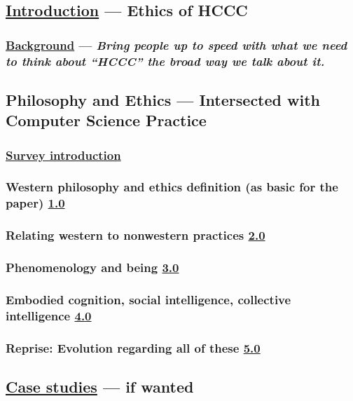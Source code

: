 \documentclass[11pt]{article}
\begin{document}
\subsection{\hyperref[sec:orga13a53c]{Introduction} — Ethics of HCCC}
\label{sec:org2f5e893}
\subsubsection{\hyperref[sec:org71daf48]{Background} — \emph{Bring people up to speed with what we need to think about “HCCC” the broad way we talk about it.}}
\label{sec:orgd7f349e}
\subsection{Philosophy and Ethics — Intersected with Computer Science Practice}
\label{sec:org7c7d609}
\subsubsection{\hyperref[sec:org6c6ca17]{Survey introduction}}
\label{sec:org123b528}
\subsubsection{Western philosophy and ethics definition (as basic for the paper) \hyperref[sec:org6bf393e]{1.0}}
\label{sec:org2c02f3f}
\subsubsection{Relating western to nonwestern practices \hyperref[sec:org017783c]{2.0}}
\label{sec:orge8198d1}
\subsubsection{Phenomenology and being \hyperref[sec:orgcbc9a7d]{3.0}}
\label{sec:org8f1f0b3}
\subsubsection{Embodied cognition, social intelligence, collective intelligence \hyperref[sec:orgda41c79]{4.0}}
\label{sec:org3036604}
\subsubsection{Reprise: Evolution regarding all of these \hyperref[sec:org887356d]{5.0}}
\label{sec:orgdecbff4}
\subsection{\hyperref[sec:orga7d5b63]{Case studies} — if wanted}
\label{sec:org7804f2a}
\end{document}

